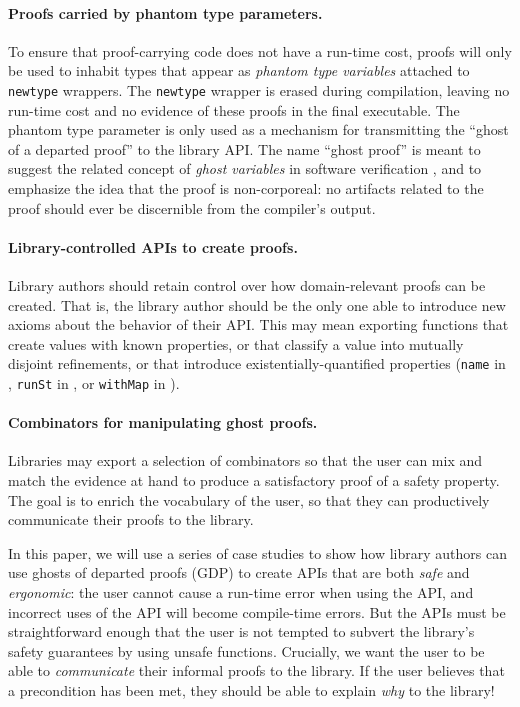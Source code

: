 \documentclass[format=sigplan, review=false, screen=true, 10pt]{acmart}
\makeatletter
\let\origsubsection\subsection
\renewcommand\subsection{\@ifstar{\starsubsection}{\nostarsubsection}}
\newcommand\nostarsubsection[1]
{\subsectionprelude\origsubsection{#1}\subsectionpostlude}
\newcommand\starsubsection[1]
{\subsectionprelude\origsubsection*{#1}\subsectionpostlude}
\newcommand\subsectionprelude{%
  \vspace{-0.25em}
}
\newcommand\subsectionpostlude{%
  \vspace{-0.05em}
}
\makeatother
\begin{document}
\paragraph{Proofs carried by phantom type parameters.}
  To ensure that proof-carrying code does not have a run-time cost, proofs will only
  be used to inhabit types that appear as \emph{phantom type variables} attached to
  \texttt{newtype} wrappers.
  The \texttt{newtype} wrapper is erased during compilation, leaving no run-time cost and
  no evidence of these proofs in the final executable.
  The phantom type parameter is only used as a mechanism for transmitting the
  ``ghost of a departed proof'' to the library API.
  The name ``ghost proof'' is meant to suggest the related concept of \emph{ghost variables} in software
  verification \cite{leavens1999jml}, and to emphasize the idea that the proof is non-corporeal: no
  artifacts related to the proof should ever be discernible from the compiler's output.
\paragraph{Library-controlled APIs to create proofs.}
  Library authors should retain control over how domain-relevant proofs can be created.
  That is, the library author should be the only one able to introduce new axioms about
  the behavior of their API.
  This may mean exporting functions that create values with known properties, or that
  classify a value into mutually disjoint refinements,
or that introduce existentially-quantified properties (\texttt{name} in , \texttt{runSt} in , or \texttt{withMap}
in ).
\paragraph{Combinators for manipulating ghost proofs.}
  Libraries may export a selection of combinators so that the user can
  mix and match the evidence at hand to produce a satisfactory proof of a
  safety property. The goal is to enrich the vocabulary of the user, so
  that they can productively communicate their proofs to the library.


\subsection{The Structure of This Paper}
In this paper, we will use a series of case studies to show how library authors can use
ghosts of departed proofs (GDP) to create
APIs that are both \emph{safe} and \emph{ergonomic}: the
user cannot cause a run-time error when using the API, and incorrect uses
of the API will become compile-time errors. But the APIs must be straightforward
enough that the user is not tempted to subvert the library's safety guarantees by using
unsafe functions. Crucially, we want the user to be able to \emph{communicate} their
informal proofs to the library. If the user believes that a precondition has been met,
they should be able to explain \emph{why} to the library!
\end{document}
